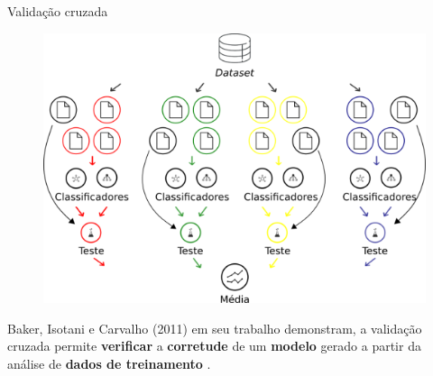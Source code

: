   \begin{frame}[fragile]{Validação cruzada}
    \begin{figure}[H]
        \begin{center}
            \includegraphics[scale=0.50]{images/validacao_cruzada.png}
        \end{center}
    \end{figure}
    Baker, Isotani e Carvalho (2011) em seu trabalho demonstram, a validação
    cruzada permite \textbf{verificar} a \textbf{corretude} de um 
    \textbf{modelo} gerado a partir da análise de \textbf{dados de treinamento} 
    \cite{baker2011mineraccao}.
  \end{frame}
